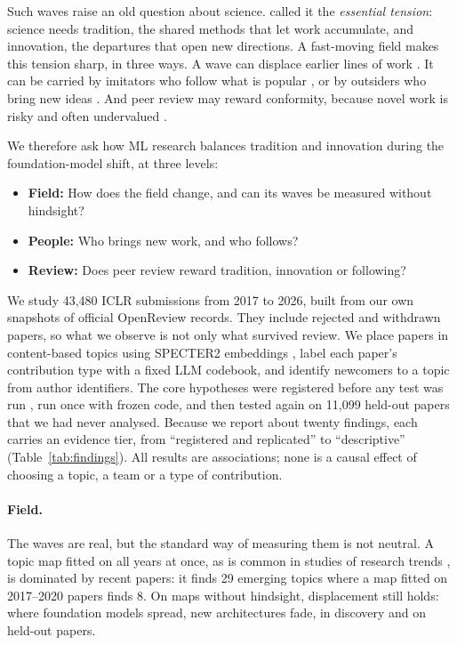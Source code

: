 \documentclass[11pt]{article}
\begin{document}
Such waves raise an old question about science. \citet{kuhn1977} called it the \emph{essential tension}: science needs
tradition, the shared methods that let work accumulate, and innovation, the departures that open new directions. A
fast-moving field makes this tension sharp, in three ways. A wave can displace earlier lines of work
\citep{kuhn1962,bommasani2021}. It can be carried by imitators who follow what is popular
\citep{abrahamson1991,bikhchandani1992}, or by outsiders who bring new ideas \citep{jeppesen2010,azoulay2019}. And
peer review may reward conformity, because novel work is risky and often undervalued
\citep{foster2015,wang2017,boudreau2016}.

We therefore ask how ML research balances tradition and innovation during the foundation-model shift, at three
levels:
\begin{itemize}
  \item[\textbf{RQ1}] \textbf{Field:} How does the field change, and can its waves be measured without hindsight?
  \item[\textbf{RQ2}] \textbf{People:} Who brings new work, and who follows?
  \item[\textbf{RQ3}] \textbf{Review:} Does peer review reward tradition, innovation or following?
\end{itemize}

We study 43,480 ICLR submissions from 2017 to 2026, built from our own snapshots of official OpenReview records. They
include rejected and withdrawn papers, so what we observe is not only what survived review. We place papers in
content-based topics using SPECTER2 embeddings \citep{singh2023}, label each paper's contribution type with a fixed
LLM codebook, and identify newcomers to a topic from author identifiers. The core hypotheses were registered before
any test was run \citep{nosek2018}, run once with frozen code, and then tested again on 11,099 held-out papers that we
had never analysed. Because we report about twenty findings, each carries an evidence tier, from ``registered and
replicated'' to ``descriptive'' (Table~\ref{tab:findings}). All results are associations; none is a causal effect of
choosing a topic, a team or a type of contribution.

\paragraph{Field.} The waves are real, but the standard way of measuring them is not neutral. A topic map fitted on
all years at once, as is common in studies of research trends \citep{hall2008}, is dominated by recent papers: it
finds 29 emerging topics where a map fitted on 2017--2020 papers finds 8. On maps without hindsight, displacement still
holds: where foundation models spread, new architectures fade, in discovery and on held-out papers.
\end{document}
